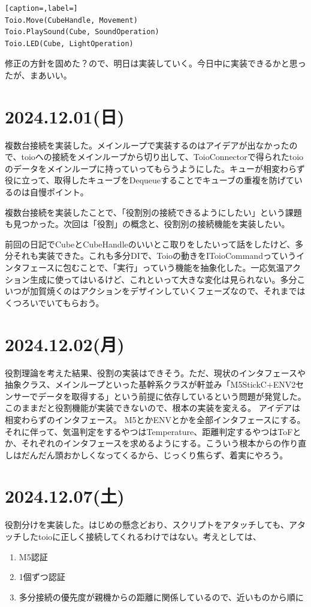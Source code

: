 \documentclass[fleqn,twocolumn]{mynote}
\begin{document}
\begin{lstlisting}[caption=,label=]
Toio.Move(CubeHandle, Movement)
Toio.PlaySound(Cube, SoundOperation)
Toio.LED(Cube, LightOperation)
\end{lstlisting}

修正の方針を固めた？ので、明日は実装していく。今日中に実装できるかと思ったが、まあいい。

\section*{2024.12.01(日)}
複数台接続を実装した。メインループで実装するのはアイデアが出なかったので、toioへの接続をメインループから切り出して、ToioConnectorで得られたtoioのデータをメインループに持っていってもらうようにした。キューが相変わらず役に立って、取得したキューブをDequeueすることでキューブの重複を防げているのは自慢ポイント。

複数台接続を実装したことで、「役割別の接続できるようにしたい」という課題も見つかった。次回は「役割」の概念と、役割別の接続機能を実装したい。

前回の日記でCubeとCubeHandleのいいとこ取りをしたいって話をしたけど、多分それも実装できた。これも多分DIで、Toioの動きをIToioCommandっていうインタフェースに包むことで、「実行」っていう機能を抽象化した。一応気温アクション生成に使ってはいるけど、これといって大きな変化は見られない。多分こいつが加賀焼くのはアクションをデザインしていくフェーズなので、それまではくつろいでいてもらおう。

\section*{2024.12.02(月)}
役割理論を考えた結果、役割の実装はできそう。ただ、現状のインタフェースや抽象クラス、メインループといった基幹系クラスが軒並み「M5StickC+ENV2センサーでデータを取得する」という前提に依存しているという問題が発覚した。このままだと役割機能が実装できないので、根本の実装を変える。
アイデアは相変わらずのインタフェース。  M5とかENVとかを全部インタフェースにする。それに伴って、気温判定をするやつはTemperature、距離判定するやつはToFとか、それぞれのインタフェースを求めるようにする。こういう根本からの作り直しはだんだん頭おかしくなってくるから、じっくり焦らず、着実にやろう。

\section*{2024.12.07(土)}
役割分けを実装した。はじめの懸念どおり、スクリプトをアタッチしても、アタッチしたtoioに正しく接続してくれるわけではない。考えとしては、
\begin{enumerate}
  \item M5認証
  \item 1個ずつ認証
  \item 多分接続の優先度が親機からの距離に関係しているので、近いものから順に
\end{enumerate}
\end{document}
